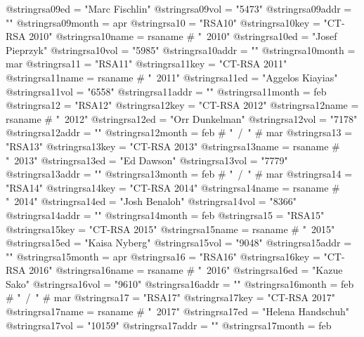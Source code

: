 @string{rsa09ed =               "Marc Fischlin"}
@string{rsa09vol =              "5473"}
@string{rsa09addr =             ""}
@string{rsa09month =            apr}
@string{rsa10 =                 "RSA10"}
@string{rsa10key =              "CT-RSA 2010"}
@string{rsa10name =             rsaname # "~2010"}
@string{rsa10ed =               "Josef Pieprzyk"}
@string{rsa10vol =              "5985"}
@string{rsa10addr =             ""}
@string{rsa10month =            mar}
@string{rsa11 =                 "RSA11"}
@string{rsa11key =              "CT-RSA 2011"}
@string{rsa11name =             rsaname # "~2011"}
@string{rsa11ed =               "Aggelos Kiayias"}
@string{rsa11vol =              "6558"}
@string{rsa11addr =             ""}
@string{rsa11month =            feb}
@string{rsa12 =                 "RSA12"}
@string{rsa12key =              "CT-RSA 2012"}
@string{rsa12name =             rsaname # "~2012"}
@string{rsa12ed =               "Orr Dunkelman"}
@string{rsa12vol =              "7178"}
@string{rsa12addr =             ""}
@string{rsa12month =            feb # "~/~" # mar}
@string{rsa13 =                 "RSA13"}
@string{rsa13key =              "CT-RSA 2013"}
@string{rsa13name =             rsaname # "~2013"}
@string{rsa13ed =               "Ed Dawson"}
@string{rsa13vol =              "7779"}
@string{rsa13addr =             ""}
@string{rsa13month =            feb # "~/~" # mar}
@string{rsa14 =                 "RSA14"}
@string{rsa14key =              "CT-RSA 2014"}
@string{rsa14name =             rsaname # "~2014"}
@string{rsa14ed =               "Josh Benaloh"}
@string{rsa14vol =              "8366"}
@string{rsa14addr =             ""}
@string{rsa14month =            feb}
@string{rsa15 =                 "RSA15"}
@string{rsa15key =              "CT-RSA 2015"}
@string{rsa15name =             rsaname # "~2015"}
@string{rsa15ed =               "Kaisa Nyberg"}
@string{rsa15vol =              "9048"}
@string{rsa15addr =             ""}
@string{rsa15month =            apr}
@string{rsa16 =                 "RSA16"}
@string{rsa16key =              "CT-RSA 2016"}
@string{rsa16name =             rsaname # "~2016"}
@string{rsa16ed =               "Kazue Sako"}
@string{rsa16vol =              "9610"}
@string{rsa16addr =             ""}
@string{rsa16month =            feb # "~/~" # mar}
@string{rsa17 =                 "RSA17"}
@string{rsa17key =              "CT-RSA 2017"}
@string{rsa17name =             rsaname # "~2017"}
@string{rsa17ed =               "Helena Handschuh"}
@string{rsa17vol =              "10159"}
@string{rsa17addr =             ""}
@string{rsa17month =            feb}
